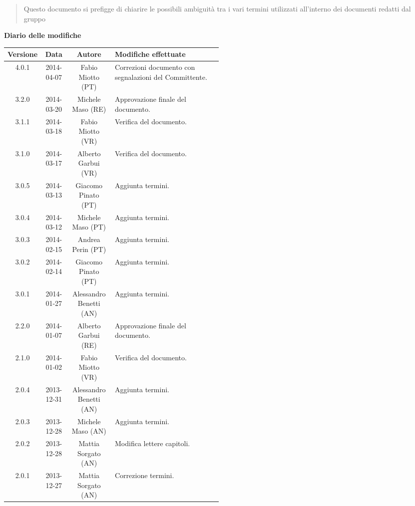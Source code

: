 \begin{abstract}
\begin{center}
Questo documento si prefigge di chiarire le possibili ambiguità tra i vari termini utilizzati all'interno dei documenti redatti dal gruppo \NomeGruppo{}
\end{center}
\end{abstract}

\newpage
\textbf{Diario delle modifiche}
\begin{center}
\begin{longtable}{|c|c|c|p{0.5\linewidth}|}
\toprule
\textbf{Versione} & \textbf{Data} & \textbf{Autore} & \textbf{Modifiche effettuate}\\

\midrule
4.0.1 & 2014-04-07 & Fabio Miotto (PT) & Correzioni documento con segnalazioni del Committente.\\
\midrule
3.2.0 & 2014-03-20 & Michele Maso (RE) & Approvazione finale del documento.\\
\midrule
3.1.1 & 2014-03-18 & Fabio Miotto (VR) & Verifica del documento. \\
\midrule
3.1.0 & 2014-03-17 & Alberto Garbui (VR) & Verifica del documento. \\
\midrule
3.0.5 & 2014-03-13 & Giacomo Pinato (PT) & Aggiunta termini.\\
\midrule
3.0.4 & 2014-03-12 & Michele Maso (PT) & Aggiunta termini.\\
\midrule
3.0.3 & 2014-02-15 & Andrea Perin (PT) & Aggiunta termini.\\
\midrule
3.0.2 & 2014-02-14 & Giacomo Pinato (PT) & Aggiunta termini.\\
\midrule
3.0.1 & 2014-01-27 & Alessandro Benetti (AN) & Aggiunta termini.\\

\midrule
2.2.0 & 2014-01-07 & Alberto Garbui (RE) & Approvazione finale del documento.\\
\midrule
2.1.0 & 2014-01-02 & Fabio Miotto (VR) & Verifica del documento.\\
\midrule
2.0.4 & 2013-12-31 & Alessandro Benetti (AN) & Aggiunta termini.\\
\midrule
2.0.3 & 2013-12-28 & Michele Maso (AN) & Aggiunta termini.\\
\midrule
2.0.2 & 2013-12-28 & Mattia Sorgato (AN) & Modifica lettere capitoli.\\
\midrule
2.0.1 & 2013-12-27 & Mattia Sorgato (AN) & Correzione termini.\\


\end{longtable}
\end{center}
